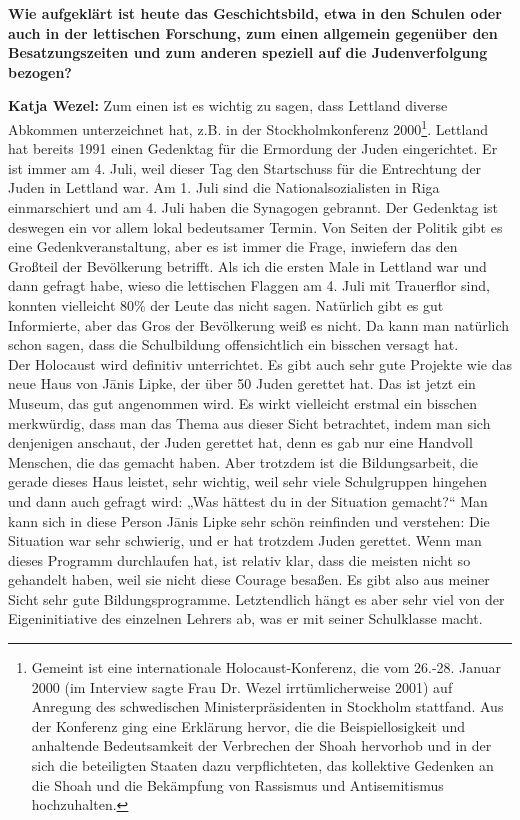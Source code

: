 \textbf{Wie aufgeklärt ist heute das Geschichtsbild, etwa in den Schulen oder auch in der lettischen Forschung, zum einen allgemein gegenüber den Besatzungszeiten und zum anderen speziell auf die Judenverfolgung bezogen?} 

\textbf{Katja Wezel:} Zum einen ist es wichtig zu sagen, dass Lettland diverse Abkommen unterzeichnet hat, z.B. in der Stockholmkonferenz 2000\footnote{Gemeint ist eine internationale Holocaust-Konferenz, die vom 26.-28. Januar 2000 (im Interview sagte Frau Dr. Wezel irrtümlicherweise 2001) auf Anregung des schwedischen Ministerpräsidenten in Stockholm stattfand. Aus der Konferenz ging eine Erklärung hervor, die die Beispiellosigkeit und anhaltende Bedeutsamkeit der Verbrechen der Shoah hervorhob und in der sich die beteiligten Staaten dazu verpflichteten, das kollektive Gedenken an die Shoah und die Bekämpfung von Rassismus und Antisemitismus hochzuhalten.}. Lettland hat bereits 1991 einen Gedenktag für die Ermordung der Juden eingerichtet. Er ist immer am 4. Juli, weil dieser Tag den Startschuss für die Entrechtung der Juden in Lettland war. Am 1. Juli sind die Nationalsozialisten in Riga einmarschiert und am 4. Juli haben die Synagogen gebrannt. Der Gedenktag ist deswegen ein vor allem lokal bedeutsamer Termin. Von Seiten der Politik gibt es eine Gedenkveranstaltung, aber es ist immer die Frage, inwiefern das den Großteil der Bevölkerung betrifft. Als ich die ersten Male in Lettland war und dann gefragt habe, wieso die lettischen Flaggen am 4. Juli mit Trauerflor sind, konnten vielleicht 80\% der Leute das nicht sagen. Natürlich gibt es gut Informierte, aber das Gros der Bevölkerung weiß es nicht. Da kann man natürlich schon sagen, dass die Schulbildung offensichtlich ein bisschen versagt hat.\\ 
Der Holocaust wird definitiv unterrichtet. Es gibt auch sehr gute Projekte wie das neue Haus von Jānis Lipke, der über 50 Juden gerettet hat. Das ist jetzt ein Museum, das gut angenommen wird. Es wirkt vielleicht erstmal ein bisschen merkwürdig, dass man das Thema aus dieser Sicht betrachtet, indem man sich denjenigen anschaut, der Juden gerettet hat, denn es gab nur eine Handvoll Menschen, die das gemacht haben. Aber trotzdem ist die Bildungsarbeit, die gerade dieses Haus leistet, sehr wichtig, weil sehr viele Schulgruppen hingehen und dann auch gefragt wird: „Was hättest du in der Situation gemacht?“ Man kann sich in diese Person Jānis Lipke sehr schön reinfinden und verstehen: Die Situation war sehr schwierig, und er hat trotzdem Juden gerettet. Wenn man dieses Programm durchlaufen hat, ist relativ klar, dass die meisten nicht so gehandelt haben, weil sie nicht diese Courage besaßen. Es gibt also aus meiner Sicht sehr gute Bildungsprogramme. Letztendlich hängt es aber sehr viel von der Eigeninitiative des einzelnen Lehrers ab, was er mit seiner Schulklasse macht. 
